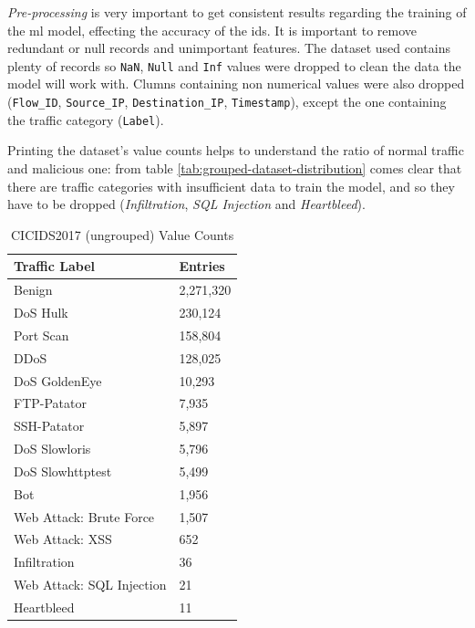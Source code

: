 \textit{Pre-processing} is very important to get consistent results regarding the training of the \gls{ml} model, effecting the accuracy of the \gls{ids}. It is important to remove redundant or null records and unimportant features. The dataset used contains plenty of records so \texttt{NaN}, \texttt{Null} and \texttt{Inf} values were dropped to clean the data the model will work with. Clumns containing non numerical values were also dropped (\texttt{Flow\_ID}, \texttt{Source\_IP}, \texttt{Destination\_IP}, \texttt{Timestamp}), except the one containing the traffic category (\texttt{Label}).
\par Printing the dataset's value counts helps to understand the ratio of normal traffic and malicious one: from table \ref{tab:grouped-dataset-distribution} comes clear that there are traffic categories with insufficient data to train the model, and so they have to be dropped (\textit{Infiltration}, \textit{SQL Injection} and \textit{Heartbleed}). 

\begin{table}[h!]
    \centering
    \begin{tabular}{l|l}
        \toprule 
        Traffic Label & Entries \\
        \midrule
        \rowcolor{black!10} Benign & 2,271,320 \\
        DoS Hulk & 230,124 \\
        \rowcolor{black!10} Port Scan & 158,804 \\
        DDoS & 128,025 \\
        \rowcolor{black!10} DoS GoldenEye & 10,293 \\
        FTP-Patator & 7,935 \\
        \rowcolor{black!10} SSH-Patator & 5,897 \\
        DoS Slowloris & 5,796 \\
        \rowcolor{black!10} DoS Slowhttptest & 5,499 \\
        Bot & 1,956 \\
        \rowcolor{black!10} Web Attack: Brute Force & 1,507 \\
        Web Attack: XSS & 652 \\
        \rowcolor{black!10} Infiltration & 36 \\
        Web Attack: SQL Injection & 21 \\
        \rowcolor{black!10} Heartbleed & 11 \\
        \bottomrule
    \end{tabular}
    \caption{CICIDS2017 (ungrouped) Value Counts}
    \label{tab:dataset-distribution}
\end{table}


